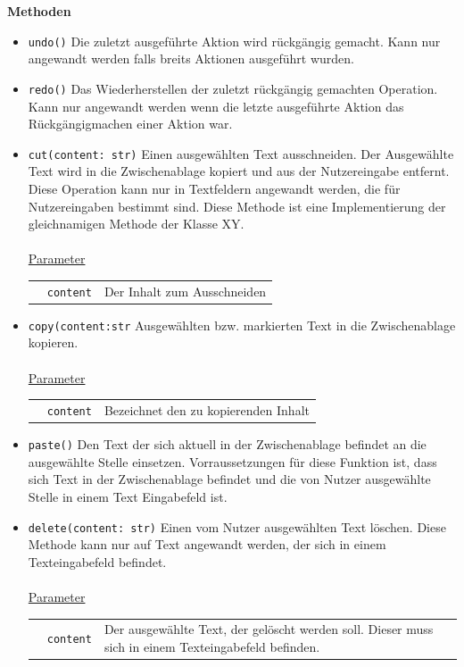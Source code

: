 \documentclass{article}
\begin{document}
\textbf{{Methoden}}
\begin{itemize}
\item \texttt{undo()} \newline Die zuletzt ausgeführte Aktion wird rückgängig gemacht. Kann nur angewandt werden falls breits Aktionen ausgeführt wurden.

\item \texttt{redo()} \newline Das Wiederherstellen der zuletzt rückgängig gemachten Operation. Kann nur angewandt werden wenn die letzte ausgeführte Aktion das Rückgängigmachen einer Aktion war.

\item \texttt{cut(content: str)} \newline Einen ausgewählten Text ausschneiden. Der Ausgewählte Text wird in die Zwischenablage kopiert und aus der Nutzereingabe entfernt. Diese Operation kann nur in Textfeldern angewandt werden, die für Nutzereingaben bestimmt sind. Diese Methode ist eine Implementierung der gleichnamigen Methode der Klasse XY.
\\\\
\underline{{Parameter}}\\ 
\begin{tabular}{lll}
 & \texttt{content} & Der Inhalt zum Ausschneiden\\
\end{tabular}

\item \texttt{copy(content:str} \newline Ausgewählten bzw. markierten Text in die Zwischenablage kopieren.
\\\\
\underline{{Parameter}}\\
\begin{tabular}{lll}
& \texttt{content} & Bezeichnet den zu kopierenden Inhalt \\
\end{tabular}

\item \texttt{paste()} \newline Den Text der sich aktuell in der Zwischenablage befindet an die ausgewählte Stelle einsetzen. Vorraussetzungen für diese Funktion ist, dass sich Text in der Zwischenablage befindet und die von Nutzer ausgewählte Stelle in einem Text Eingabefeld ist.

\item \texttt{delete(content: str)} \newline Einen vom Nutzer ausgewählten Text löschen. Diese Methode kann nur auf Text angewandt werden, der sich in einem Texteingabefeld befindet.
\\\\
\underline{{Parameter}}\\ 
\begin{tabular}{llp{8.7cm}}
&\texttt{content} & Der ausgewählte Text, der gelöscht werden soll. Dieser muss sich in einem Texteingabefeld befinden.\\
\end{tabular}


\end{itemize}
\end{document}
